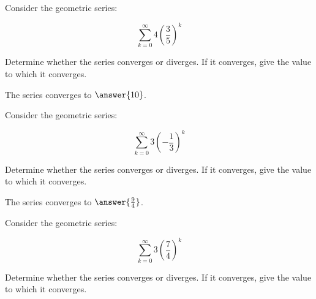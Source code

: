 \documentclass{ximera}
\author{Jim Talamo}
\begin{document}
\begin{exercise}
Consider the geometric series:

\[
\sum_{k=0}^{\infty} 4\left(\frac{3}{5}\right)^k
\]

Determine whether the series converges or diverges.  If it converges, give the value to which it converges.

\begin{multipleChoice}
\end{multipleChoice}

\begin{exercise}
The series converges to $\answer{10}$.
\end{exercise}
\end{exercise}

\begin{exercise}
Consider the geometric series:

\[
\sum_{k=0}^{\infty} 3\left(-\frac{1}{3}\right)^k
\]

Determine whether the series converges or diverges.  If it converges, give the value to which it converges.

\begin{multipleChoice}
\end{multipleChoice}

\begin{exercise}
The series converges to $\answer{\frac{9}{4}}$.
\end{exercise}
\end{exercise}

\begin{exercise}
Consider the geometric series:

\[
\sum_{k=0}^{\infty} 3\left(\frac{7}{4}\right)^k
\]

Determine whether the series converges or diverges.  If it converges, give the value to which it converges.

\begin{multipleChoice}
\end{multipleChoice}

\end{exercise}
\end{document}
